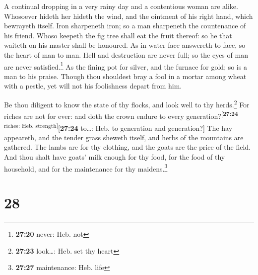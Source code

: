  A continual dropping in a very rainy day and a
contentious woman are alike.  Whosoever hideth her hideth
the wind, and the ointment of his right hand, which bewrayeth itself.
 Iron sharpeneth iron; so a man sharpeneth the
countenance of his friend.  Whoso keepeth the fig tree
shall eat the fruit thereof: so he that waiteth on his master shall be
honoured.  As in water face answereth to face, so the
heart of man to man.  Hell and destruction are never
full; so the eyes of man are never satisfied.\footnote{\textbf{27:20}
  never: Heb. not}  As the fining pot for silver, and the
furnace for gold; so is a man to his praise.  Though thou
shouldest bray a fool in a mortar among wheat with a pestle, yet will
not his foolishness depart from him.

 Be thou diligent to know the state of thy flocks, and
look well to thy herds.\footnote{\textbf{27:23} look\ldots: Heb. set thy
  heart}  For riches are not for ever: and doth the crown
endure to every generation?\textsuperscript{{[}\textbf{27:24} riches:
Heb. strength{]}}{[}\textbf{27:24} to\ldots: Heb. to generation and
generation?{]}  The hay appeareth, and the tender grass
sheweth itself, and herbs of the mountains are gathered. 
The lambs are for thy clothing, and the goats are the price of the
field.  And thou shalt have goats' milk enough for thy
food, for the food of thy household, and for the maintenance for thy
maidens.\footnote{\textbf{27:27} maintenance: Heb. life}

\hypertarget{section-27}{%
\section{28}\label{section-27}}

